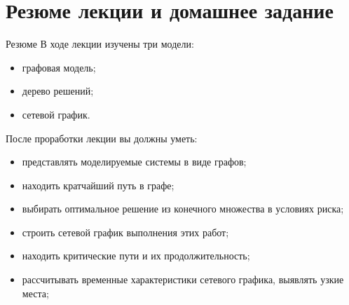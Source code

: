 \documentclass[unicode,11pt,notheorems]{beamer}
\begin{document}
\section{Резюме лекции и домашнее задание}
\begin{frame}{Резюме}
В ходе лекции изучены три модели:
	\begin{itemize}
		\item графовая модель;
		\item дерево решений;
		\item сетевой график.
	\end{itemize}		

\medskip
	После проработки лекции вы должны уметь:
	\begin{itemize}
	\item 
		представлять моделируемые системы в виде графов;
	\item 
		находить кратчайший путь в графе;
	\item 
		выбирать оптимальное решение из конечного множества в условиях риска;
	\item 
		строить сетевой график выполнения этих работ;
	\item 
		находить критические пути и их продолжительность;
	\item 
		рассчитывать временные характеристики сетевого графика, выявлять узкие места;
	\end{itemize}		
\end{frame}
\end{document}

